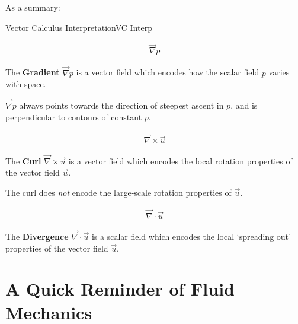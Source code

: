 As a summary:
\begin{fact}{Vector Calculus Interpretation}{VC Interp}\label{VC Interp}
    \begin{minipage}{.39\linewidth}
    \begin{tcolorbox}[colback=myyellow!50!white,colframe=mymagenta]
        \begin{align*}
            \vec{\nabla}p
        \end{align*}

        The \textbf{Gradient} \(\vec{\nabla}p\) is a vector field which encodes how the scalar field \(p\) varies with space.

        \(\vec{\nabla}p\) always points towards the direction of steepest ascent in \(p\), and is perpendicular to contours of constant \(p\).
    \end{tcolorbox}
    \end{minipage}
    \begin{minipage}{.34\linewidth}
    \begin{tcolorbox}[colback=myyellow!50!white,colframe=mymagenta]
        \begin{align*}
            \vec{\nabla}\times \vec{u}
        \end{align*}

        The \textbf{Curl} \(\vec{\nabla}\times \vec{u}\) is a vector field which encodes the local rotation properties of the vector field \(\vec{u}\).

        The curl does \textit{not} encode the large-scale rotation properties of \(\vec{u}\).
    \end{tcolorbox}
    \end{minipage}
    \begin{minipage}{.25\linewidth}
    \begin{tcolorbox}[colback=myyellow!50!white,colframe=mymagenta]
        \begin{align*}
            \vec{\nabla}\cdot\vec{u}
        \end{align*}

        The \textbf{Divergence} \(\vec{\nabla}\cdot\vec{u}\) is a scalar field which encodes the local `spreading out' properties of the vector field \(\vec{u}\).
    \end{tcolorbox}
    \end{minipage}
\end{fact}

\section{A Quick Reminder of Fluid Mechanics}\label{s Fluid Mechanics}

